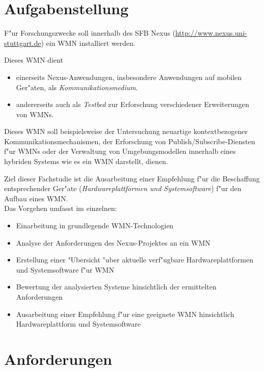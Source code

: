 \section{Aufgabenstellung}

F"ur Forschungszwecke soll innerhalb des SFB Nexus
(\url{http://www.nexus.uni-stuttgart.de}) 
ein WMN installiert werden. 

Dieses WMN dient 
\begin{itemize}
	\item einerseits Nexus-Anwendungen, insbesondere Anwendungen 
	auf mobilen Ger"aten, als \emph{Kommunikationsmedium}. 

	\item andererseits auch als \emph{Testbed} 
	zur Erforschung verschiedener Erweiterungen von WMNs.
\end{itemize}

Dieses WMN soll beispielsweise der Untersuchung neuartige kontextbezogener 
Kommunikationsmechanismen, der Erforschung von 
Publish/Subscribe-Diensten f"ur WMNs oder der 
Verwaltung von Umgebungsmodellen innerhalb eines 
hybriden Systems wie es ein WMN darstellt, dienen.

Ziel dieser Fachstudie ist die Ausarbeitung einer 
Empfehlung f"ur die Beschaffung entsprechender Ger"ate 
(\emph{Hardwareplattformen und Systemsoftware}) f"ur
den Aufbau eines WMN. \\

Das Vorgehen umfasst im einzelnen:

\begin{itemize}
	
	\item Einarbeitung in grundlegende WMN-Technologien
	\item Analyse der Anforderungen des Nexus-Projektes an ein WMN
	\item Erstellung einer "Ubersicht "uber aktuelle verf"ugbare 
	Hardwareplattformen und Systemsoftware f"ur WMN
	\item Bewertung der analysierten Systeme hinsichtlich 
	der ermittelten Anforderungen 	
	\item Ausarbeitung einer Empfehlung f"ur eine geeignete 
	WMN hinsichtlich Hardwareplattform und Systemsoftware
	
\end{itemize}


\section{Anforderungen}

